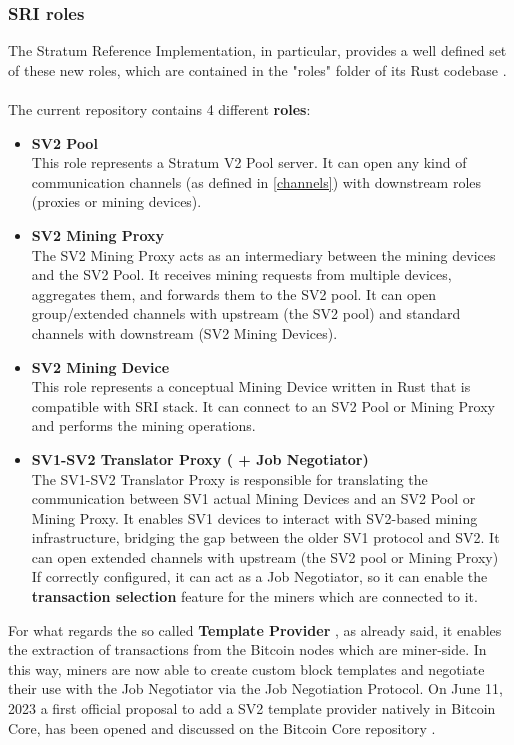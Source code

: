 \subsubsection{SRI roles}
The Stratum Reference Implementation, in particular, provides a well defined set of these new roles, which are contained in the "roles" folder of its Rust codebase \cite{githubStratummining}.\\\\
The current repository contains 4 different \textbf{roles}:
\begin{itemize}
    \item \textbf{SV2 Pool}\\
    This role represents a Stratum V2 Pool server. It can open any kind of communication channels (as defined in \ref{channels}) with downstream roles (proxies or mining devices).
    \item \textbf{SV2 Mining Proxy}\\
    The SV2 Mining Proxy acts as an intermediary between the mining devices and the SV2 Pool. It receives mining requests from multiple devices, aggregates them, and forwards them to the SV2 pool. It can open group/extended channels with upstream (the SV2 pool) and standard channels with downstream (SV2 Mining Devices).
    \item \textbf{SV2 Mining Device}\\
    This role represents a conceptual Mining Device written in Rust that is compatible with SRI stack. It can connect to an SV2 Pool or Mining Proxy and performs the mining operations. 
    \item \textbf{SV1-SV2 Translator Proxy ( + Job Negotiator)}\\
     The SV1-SV2 Translator Proxy is responsible for translating the communication between SV1 actual Mining Devices and an SV2 Pool or Mining Proxy. It enables SV1 devices to interact with SV2-based mining infrastructure, bridging the gap between the older SV1 protocol and SV2. It can open extended channels with upstream (the SV2 pool or Mining Proxy)\\
     If correctly configured, it can act as a Job Negotiator, so it can enable the \textbf{transaction selection} feature for the miners which are connected to it.
\end{itemize}

\noindent For what regards the so called \textbf{Template Provider} \cite{githubGitHubStratumminingbitcoin}, as already said, it enables the extraction of transactions from the Bitcoin nodes which are miner-side. In this way, miners are now able to create custom block templates and negotiate their use with the Job Negotiator via the Job Negotiation Protocol.
On June 11, 2023 a first official proposal to add a SV2 template provider natively in Bitcoin Core, has been opened and discussed on the Bitcoin Core repository \cite{githubWIPStratum}.\\
    
